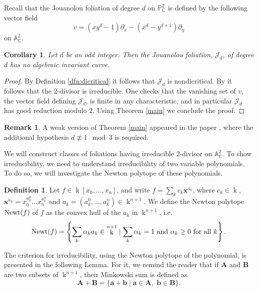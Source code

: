 \documentclass[reqno,oneside,11pt]{amsart}
\newtheorem{cor}[thm]{Corollary}
\theoremstyle{definition}
\newtheorem{OBS}[thm]{Remark}
\newtheorem{dfn}[thm]{Definition}
\DeclareMathOperator{\field}{k}
\begin{document}
Recall that the Jouanolou foliation of degree $d$ on $\mathbb{P}_{\mathbb{C}}^{2}$ is defined by the following vector field
$$
    v = (xy^{d}-1)\partial_{x}-(x^{d}-y^{d+1})\partial_{y}
$$
on $\mathbb{A}^2_\mathbb{C}$.

\begin{cor}\label{Jouuu} Let $d$ be an odd integer. Then the Jouanolou foliation, $\mathcal{J}_d$, of degree $d$ has no algebraic invariant curve.
\end{cor}

\begin{proof} By Definition \ref{dfn:dicritical} it follows that $\mathcal{J}_d$ is nondicritical. By \cite[Proposition 6.3]{mendson2023arithmetic} it follows that the $2$-divisor is irreducible. One checks that the vanishing set of $v$, the vector field defining $\mathcal{J}_d$, is finite in any characteristic, and in particular $\mathcal{J}_d$ has good reduction modulo $2$. Using Theorem \ref{main} we conclude the proof.
\end{proof}

\begin{OBS} 
     A weak version of Theorem \ref{main} appeared in the paper \cite{mendson2022}, where the additional hypothesis $d \not\equiv 1 \mod 3$ is required. 
\end{OBS}

We will construct classes of foliations having irreducible $2$-divisor on $\mathbb{A}^2_\mathbb{C}$. To show irreducibility, we need to understand irreducibility of two variable polynomials. To do so, we will investigate the Newton polytope of these polynomials.

\begin{dfn}
    Let $f \in \field[x_0,\dots,x_n]$, and write $f = \sum_k c_k \mathbf{x}^{a_k}$, where $c_k \in \field$, $\mathbf{x}^{a_k} = x_0^{a_k^0}\dots x_n^{a_k^n}$ and $a_k = (a_k^0,\dots,a_k^n) \in \field^{n+1}$. We define the Newton polytope ${\rm Newt}(f)$ of $f$ as the convex hull of the $a_k$ in $\field^{n+1}$, i.e.
    \[{\rm Newt}(f) = \left\{ \sum_k \alpha_k a_k \in \field^{n+1} \mid \sum_k \alpha_k = 1 \text{ and } \alpha_k \geq 0 \text{ for all } k\right\}.\]
\end{dfn}

The criterion for irreducibility, using the Newton polytope of the polynomial, is presented in the following Lemma. For it, we remind the reader that if $\mathbf{A}$ and $\mathbf{B}$ are two subsets of $\field^{n+1}$, their Minkowski sum is defined as 
\[\mathbf{A} + \mathbf{B} = \{\mathbf{a} + \mathbf{b} \mid \mathbf{a} \in \mathbf{A}, \,\, \mathbf{b} \in \mathbf{B}\}.\]
\end{document}
